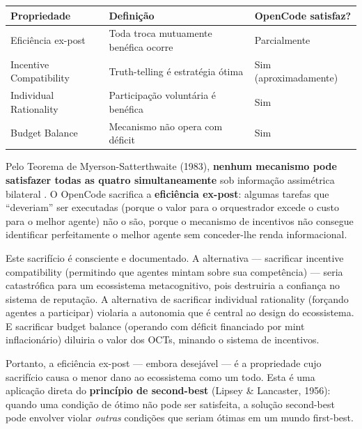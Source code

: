 \begin{center}
\begin{tabular}{p{4cm}p{4cm}p{4cm}}
\hline
\textbf{Propriedade} & \textbf{Definição} & \textbf{OpenCode satisfaz?} \\
\hline
Eficiência ex-post & Toda troca mutuamente benéfica ocorre & Parcialmente \\
\hline
Incentive Compatibility & Truth-telling é estratégia ótima & Sim (aproximadamente) \\
\hline
Individual Rationality & Participação voluntária é benéfica & Sim \\
\hline
Budget Balance & Mecanismo não opera com déficit & Sim \\
\hline
\end{tabular}
\end{center}

Pelo Teorema de Myerson-Satterthwaite (1983), \textbf{nenhum mecanismo pode satisfazer todas as quatro simultaneamente} sob informação assimétrica bilateral \cite{myerson1983efficient}. O OpenCode sacrifica a \textbf{eficiência ex-post}: algumas tarefas que ``deveriam'' ser executadas (porque o valor para o orquestrador excede o custo para o melhor agente) não o são, porque o mecanismo de incentivos não consegue identificar perfeitamente o melhor agente sem conceder-lhe renda informacional.

Este sacrifício é consciente e documentado. A alternativa --- sacrificar incentive compatibility (permitindo que agentes mintam sobre sua competência) --- seria catastrófica para um ecossistema metacognitivo, pois destruiria a confiança no sistema de reputação. A alternativa de sacrificar individual rationality (forçando agentes a participar) violaria a autonomia que é central ao design do ecossistema. E sacrificar budget balance (operando com déficit financiado por mint inflacionário) diluiria o valor dos OCTs, minando o sistema de incentivos.

Portanto, a eficiência ex-post --- embora desejável --- é a propriedade cujo sacrifício causa o menor dano ao ecossistema como um todo. Esta é uma aplicação direta do \textbf{princípio de second-best} (Lipsey \& Lancaster, 1956): quando uma condição de ótimo não pode ser satisfeita, a solução second-best pode envolver violar \textit{outras} condições que seriam ótimas em um mundo first-best.


